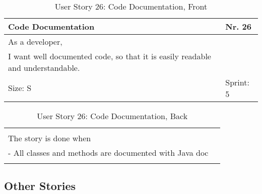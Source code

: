 \ \\ 

\begin{table}[H]
  \caption{User Story 26: Code Documentation, Front}
  \label{Story_26_Front}
  \centering
  \begin{tabular}{|p{9cm} p{2cm}|}
	\hline  	
  	Code Documentation & Nr. 26 \\ 
  	\hline
  	As a developer, &    \\ 
  	I want well documented code, so that it is easily readable and understandable. &    \\ 
  	Size: S & Sprint: 5 \\ 
  	\hline
  \end{tabular}
\end{table}
\begin{table}[H]
  \caption{User Story 26: Code Documentation, Back}
  \label{Story_26_Back}
  \centering
  \begin{tabular}{|p{10cm} p{1cm}|}
  \hline
  	  &    \\ 
  	The story is done when &    \\ 
  	 - All classes and methods are documented with Java doc & \\ 
  	 
  	  &  
  	   \\ 
  	\hline
  \end{tabular}
\end{table} 

\subsection*{Other Stories}

